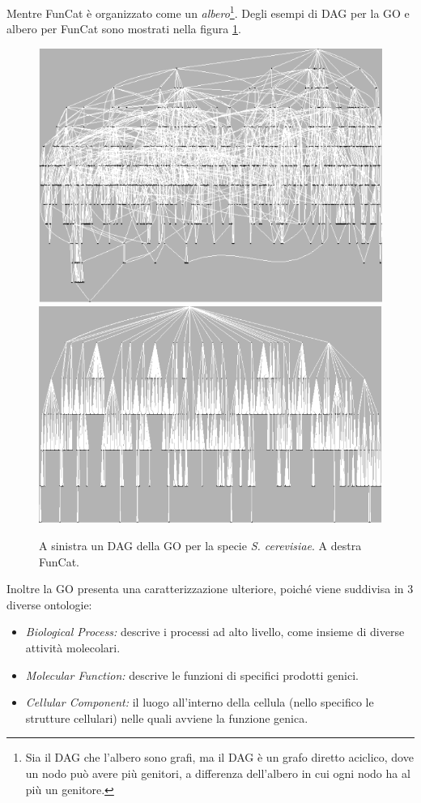 \documentclass[12pt]{report}
\begin{document}
Mentre FunCat è organizzato come un \emph{albero}\footnote{\footnotesize{Sia il DAG che l'albero sono grafi, ma il DAG è un grafo diretto aciclico, dove un nodo può avere più genitori, a differenza dell'albero in cui ogni nodo ha al più un genitore.}}. Degli esempi di DAG per la GO e albero per FunCat sono mostrati nella figura \ref{DAGTREE}.
\newline
\newline
\begin{figure}[h]
\center
\includegraphics[scale=0.3]{./images/GO.png}
\includegraphics[scale=0.29]{./images/FunCat.png}
\caption{\footnotesize{A sinistra un DAG della GO per la specie \emph{S. cerevisiae}. A destra FunCat.}}
\label{DAGTREE}
\end{figure}
\newline
\newline
Inoltre la GO presenta una caratterizzazione ulteriore, poiché viene suddivisa in 3 diverse ontologie:
\begin{itemize}
\item \textit{Biological Process:} descrive i processi ad alto livello, come insieme di diverse attività molecolari.
\item \emph{Molecular Function:}                  descrive le funzioni di specifici prodotti genici.
\item \emph{Cellular Component:} il luogo all'interno della cellula (nello specifico le strutture cellulari) nelle quali avviene la funzione genica.
\end{itemize}
\end{document}
